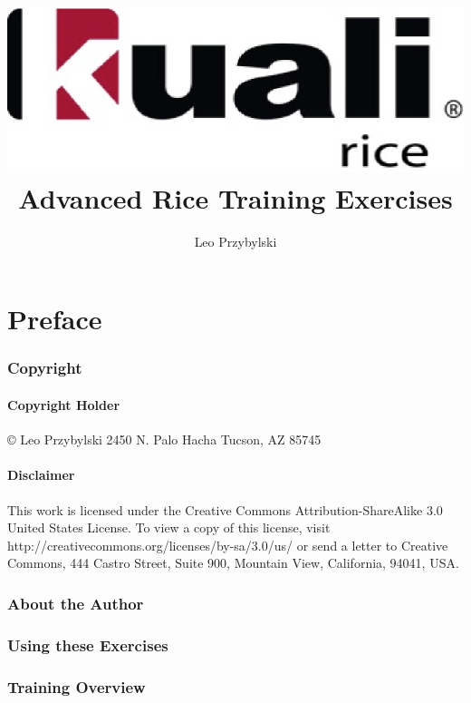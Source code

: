 \documentclass[letterpaper,notitlepage,12pt]{book}
\author{Leo Przybylski}
\title{\includegraphics[width=\textwidth]{cover.eps}\\Advanced Rice Training Exercises}
\date{}
\begin{document}
\maketitle
\tableofcontents

\part*{Preface}

\section*{Copyright}
\subsection*{Copyright Holder}
\copyright
Leo Przybylski
2450 N. Palo Hacha
Tucson, AZ 85745

\subsection*{Disclaimer}
This work is licensed under the Creative Commons Attribution-ShareAlike 3.0 United States License. To view a copy of this license, visit http://creativecommons.org/licenses/by-sa/3.0/us/ or send a letter to Creative Commons, 444 Castro Street, Suite 900, Mountain View, California, 94041, USA.

\section*{About the Author}

\section*{Using these Exercises}

\section*{Training Overview}







\end{document}
